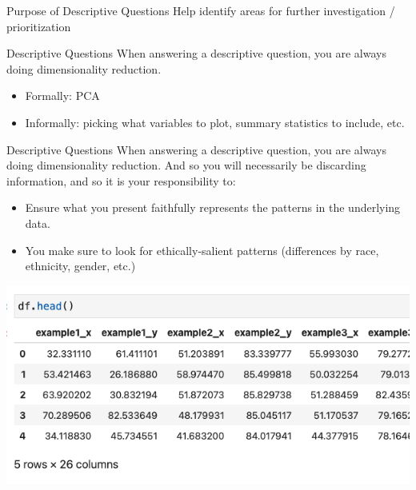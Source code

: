 \documentclass[11pt]{beamer}
\begin{document}
\begin{frame}[c]{Purpose of Descriptive Questions}
\pause Help identify areas for further investigation / prioritization 
\end{frame}
  

\begin{frame}[c]{Descriptive Questions}
\pause When answering a descriptive question, you are always doing \alert{dimensionality reduction}.
\begin{itemize}
  \pause \item Formally: PCA
  \pause \item Informally: picking what variables to plot, summary statistics to include, etc. 
\end{itemize}
\end{frame}

\begin{frame}[c]{Descriptive Questions}
  When answering a descriptive question, you are always doing \alert{dimensionality reduction}. \pause And so you will necessarily be \alert{discarding information}, and so it is \alert{your responsibility to:}
  \begin{itemize}
    \pause \item Ensure what you present faithfully represents the patterns in the underlying data. 
    \pause \item You make sure to look for ethically-salient patterns (differences by race, ethnicity, gender, etc.)
  \end{itemize}
  \end{frame}
  

\begin{frame}[c]{}
\includegraphics[width=\textwidth]{datasaurus_1.png}
\end{frame}
\end{document}
